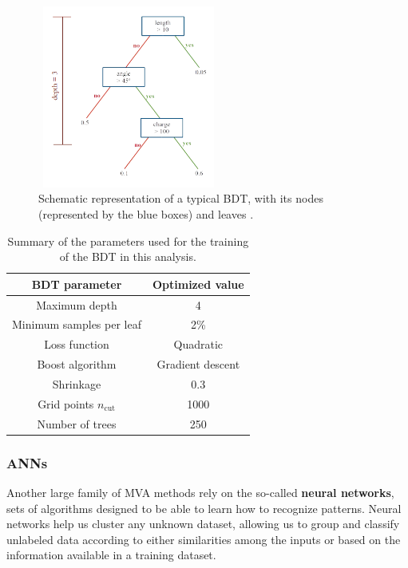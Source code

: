 \documentclass[a4paper, 10pt, openright]{report}
\begin{document}
\begin{figure}[htbp]
\centering
\includegraphics[width=6cm, height=6cm]{figs/BDT.png}
\caption{Schematic representation of a typical \ac{BDT}, with its nodes (represented by the blue boxes) and leaves \cite{FNALBDT}.}
\label{fig:BDT}
\end{figure}

\begin{table}
\begin{center}
\begin{tabular}{ c|c } 
\hline
 BDT parameter & Optimized value \\
 \hline
 Maximum depth & 4 \\
 Minimum samples per leaf & 2\% \\
 Loss function & Quadratic \\
 Boost algorithm & Gradient descent \\
 Shrinkage & 0.3 \\
 Grid points $n_{\text{cut}}$ & 1000 \\
 Number of trees & 250 \\
\hline
\end{tabular}
\caption{Summary of the parameters used for the training of the \ac{BDT} in this analysis.}
\label{table:BDT}
\end{center}
\end{table}

\subsubsection*{\acfp{ANN}}\label{section:DNN}

Another large family of \ac{MVA} methods rely on the so-called \textbf{neural networks}, sets of algorithms designed to be able to learn how to recognize patterns. Neural networks help us cluster any unknown dataset, allowing us to group and classify unlabeled data according to either similarities among the inputs or based on the information available in a training dataset.
\end{document}
